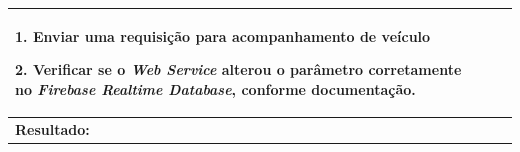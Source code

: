 \documentclass[
	12pt,				%
	oneside,			%
	a4paper,			%
	brazil				%
]{abntex2}
\begin{document}
\begin{apendicesenv}
\begin{table}[H]
\begin{tabularx}{\textwidth}{|l|>{\hsize=2\hsize}X|c|}
{1. Enviar uma requisição para acompanhamento de veículo

2. Verificar se o \textit{Web Service} alterou o parâmetro corretamente no \textit{Firebase Realtime Database}, conforme documentação.
} \\ 
\hline 
\multicolumn{3}{|X|}{\textbf{Resultado:}} \\ 
\hline 
\end{tabularx} 
\end{table}
\egroup

\end{apendicesenv}
\end{document}
